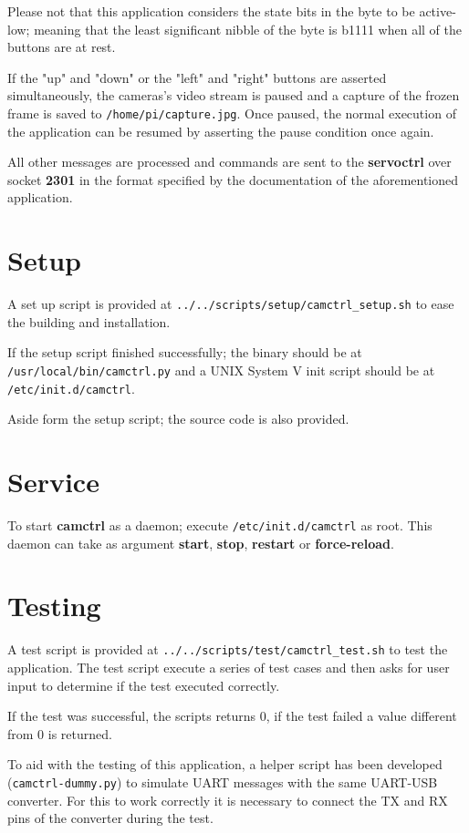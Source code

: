 Please not that this application considers the state bits in the byte to be
active-low; meaning that the least significant nibble of the byte is b1111 when
all of the buttons are at rest.

If the "up" and "down" or the "left" and "right" buttons are asserted
simultaneously, the cameras's video stream is paused and a capture of the frozen
frame is saved to \texttt{/home/pi/capture.jpg}. Once paused, the normal
execution of the application can be resumed by asserting the pause condition
once again.

All other messages are processed and commands are sent to the \textbf{servoctrl}
over socket \textbf{2301} in the format specified by the documentation of the
aforementioned application.

\section{Setup}
A set up script is provided at \texttt{../../scripts/setup/camctrl\_setup.sh}
to ease the building and installation.

If the setup script finished successfully; the binary should be at\\
\texttt{/usr/local/bin/camctrl.py} and a UNIX System V init script should be
at\\ \texttt{/etc/init.d/camctrl}.

Aside form the setup script; the source code is also provided.

\section{Service} \label{sec:service}
To start \textbf{camctrl} as a daemon; execute \texttt{/etc/init.d/camctrl}
as root. This daemon can take as argument \textbf{start}, \textbf{stop},
\textbf{restart} or \textbf{force-reload}.

\section{Testing}
A test script is provided at \texttt{../../scripts/test/camctrl\_test.sh} to
test the application. The test script execute a series of test cases and then
asks for user input to determine if the test executed correctly.

If the test was successful, the scripts returns 0, if the test failed a value
different from 0 is returned.

To aid with the testing of this application, a helper script has been developed
(\texttt{camctrl-dummy.py}) to simulate UART messages with the same UART-USB
converter. For this to work correctly it is necessary to connect the TX and RX
pins of the converter during the test.

